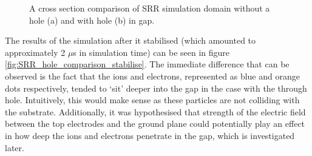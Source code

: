 \begin{figure}[h!]
\begin{subfigure}{.5\textwidth}
        \caption{}
        \label{fig:SRR_with_gap_start}
    \end{subfigure}
    \caption{A cross section comparison of SRR simulation domain without a hole (a) and with hole (b) in gap.}
    \label{fig:SRR_hole_comparison_start}
\end{figure}

The results of the simulation after it stabilised (which amounted to approximately 2 $\mu$s in simulation time) can be seen in figure \ref{fig:SRR_hole_comparison_stabilise}. The immediate difference that can be observed is the fact that the ions and electrons, represented as blue and orange dots respectively, tended to `sit' deeper into the gap in the case with the through hole. Intuitively, this would make sense as these particles are not colliding with the substrate. Additionally, it was hypothesised that strength of the electric field between the top electrodes and the ground plane could potentially play an effect in how deep the ions and electrons penetrate in the gap, which is investigated later.


